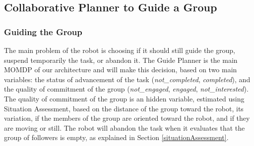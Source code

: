 \subsection{Collaborative Planner to Guide a Group}




\vspace{-5pt}
\subsubsection{Guiding the Group}
The main problem of the robot is choosing if it should still guide the group, suspend temporarily the task, or abandon it. The Guide Planner is the main MOMDP of our architecture and will make this decision, based on two main variables: the status of advancement of the task (\textit{not\_completed}, \textit{completed}), and the quality of commitment of the group (\textit{not\_engaged}, \textit{engaged}, \textit{not\_interested}). The quality of commitment of the group is an hidden variable, estimated using  Situation Assessment, based on the distance of the group toward the robot, its variation, if the members of the group are oriented toward the robot, and if they are moving or still. The robot will abandon the task when it evaluates that the group of followers is empty, as explained in Section \ref{situationAssessment}.

